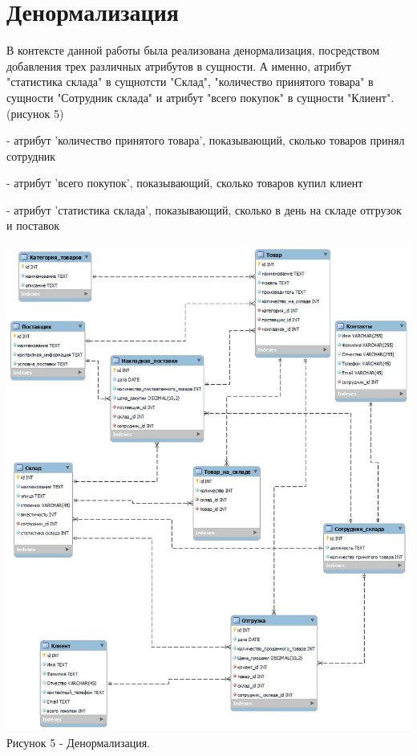 \documentclass[14pt]{extreport}
\begin{document}
\section{Денормализация}

В контексте данной работы была реализована денормализация, посредством добавления трех различных атрибутов в сущности. А именно, атрибут "статистика склада" в сущнотсти "Склад", "количество принятого товара" в сущности "Сотрудник склада" и атрибут "всего покупок" в сущности "Клиент". (рисунок 5)


- атрибут 'количество принятого товара', показывающий, сколько товаров принял сотрудник


- атрибут 'всего покупок', показывающий, сколько товаров купил клиент


- атрибут 'статистика склада', показывающий, сколько в день на складе отгрузок и поставок


\begin{center}
    \centering 
    \includegraphics[width=1.0\linewidth]{denorm.jpg}
    \\Рисунок 5 - Денормализация.
\end{center}
\newpage
\end{document}
